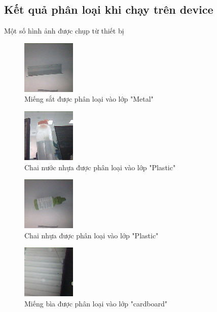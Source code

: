 \subsection{Kết quả phân loại khi chạy trên device}

Một số hình ảnh được chụp từ thiết bị
\begin{figure}[H]
    \centering
    \includegraphics[width=0.25\linewidth]{images/Quanh/metal.bmp}
    \caption{ Miếng sắt được phân loại vào lớp "Metal" }
    \label{fig:Dmetal}
\end{figure}

\begin{figure}[H]
    \centering
    \includegraphics[width=0.25\linewidth]{images/Quanh/plastic.bmp}
    \caption{ Chai nước nhựa được phân loại vào lớp "Plastic" }
    \label{fig:Dplastic}
\end{figure}

\begin{figure}[H]
    \centering
    \includegraphics[width=0.25\linewidth]{images/Quanh/plastic2.bmp}
    \caption{ Chai nhựa được phân loại vào lớp "Plastic" }
    \label{fig:Dplastic2}
\end{figure}

\begin{figure}[H]
    \centering
    \includegraphics[width=0.25\linewidth]{images/Quanh/cardboard.bmp}
    \caption{ Miếng bìa được phân loại vào lớp "cardboard" }
    \label{fig:Dcardboard}
\end{figure}

